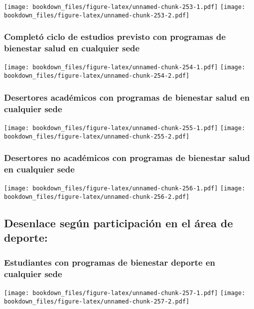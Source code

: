 \documentclass[]{article}
\theoremstyle{definition}
\theoremstyle{definition}
\theoremstyle{definition}
\theoremstyle{remark}
\begin{document}
\texttt{[image: bookdown\_files/figure-latex/unnamed-chunk-253-1.pdf]}
\texttt{[image: bookdown\_files/figure-latex/unnamed-chunk-253-2.pdf]}

\subsubsection{Completó ciclo de estudios previsto con programas de
bienestar salud en cualquier
sede}\label{completo-ciclo-de-estudios-previsto-con-programas-de-bienestar-salud-en-cualquier-sede-1}

\texttt{[image: bookdown\_files/figure-latex/unnamed-chunk-254-1.pdf]}
\texttt{[image: bookdown\_files/figure-latex/unnamed-chunk-254-2.pdf]}

\subsubsection{Desertores académicos con programas de bienestar salud en
cualquier
sede}\label{desertores-academicos-con-programas-de-bienestar-salud-en-cualquier-sede-1}

\texttt{[image: bookdown\_files/figure-latex/unnamed-chunk-255-1.pdf]}
\texttt{[image: bookdown\_files/figure-latex/unnamed-chunk-255-2.pdf]}

\subsubsection{Desertores no académicos con programas de bienestar salud
en cualquier
sede}\label{desertores-no-academicos-con-programas-de-bienestar-salud-en-cualquier-sede-1}

\texttt{[image: bookdown\_files/figure-latex/unnamed-chunk-256-1.pdf]}
\texttt{[image: bookdown\_files/figure-latex/unnamed-chunk-256-2.pdf]}

\subsection{Desenlace según participación en el área de
deporte:}\label{desenlace-segun-participacion-en-el-area-de-deporte-1}

\subsubsection{Estudiantes con programas de bienestar deporte en
cualquier
sede}\label{estudiantes-con-programas-de-bienestar-deporte-en-cualquier-sede-1}

\texttt{[image: bookdown\_files/figure-latex/unnamed-chunk-257-1.pdf]}
\texttt{[image: bookdown\_files/figure-latex/unnamed-chunk-257-2.pdf]}
\end{document}
